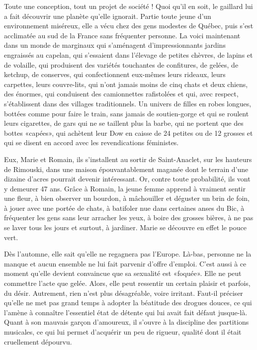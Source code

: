 Toute une conception, tout un projet de société ! Quoi qu’il en soit, le gaillard lui a fait découvrir une planète qu’elle ignorait. Partie toute jeune d’un environnement miséreux, elle a vécu chez des gens modestes de Québec, puis s’est acclimatée au sud de la France sans fréquenter personne. La voici maintenant dans un monde de marginaux qui s’aménagent d’impressionnants jardins engraissés au capelan, qui s’essaient dans l’élevage de petites chèvres, de lapins et de volaille, qui produisent des variétés touchantes de confitures, de gelées, de ketchup, de conserves, qui confectionnent eux-mêmes leurs rideaux, leurs carpettes, leurs couvre-lits, qui n’ont jamais moins de cinq chats et deux chiens, des énormes, qui conduisent des camionnettes rafistolées et qui, avec respect, s’établissent dans des villages traditionnels. Un univers de filles en robes longues, bottées comme pour faire le train, sans jamais de soutien-gorge et qui se roulent leurs cigarettes, de gars qui ne se taillent plus la barbe, qui ne portent que des bottes «capées», qui achètent leur Dow en caisse de 24 petites ou de 12 grosses et qui se disent en accord avec les revendications féministes.

Eux, Marie et Romain, ils s’installent au sortir de Saint-Anaclet, sur les hauteurs de Rimouski, dans une maison épouvantablement maganée dont le terrain d’une dizaine d’acres pourrait devenir intéressant. Or, contre toute probabilité, ils vont y demeurer 47 ans. Grâce à Romain, la jeune femme apprend à vraiment sentir une fleur, à bien observer un bourdon, à mâchouiller et déguster un brin de foin, à jouer avec une portée de chats, à batifoler nue dans certaines anses du Bic, à fréquenter les gens sans leur arracher les yeux, à boire des grosses bières, à ne pas se laver tous les jours et surtout, à jardiner. Marie se découvre en effet le pouce vert.

Dès l’automne, elle sait qu’elle ne regagnera pas l’Europe. Là-bas, personne ne la manque et aucun ensemble ne lui fait parvenir d’offre d’emploi. C’est aussi à ce moment qu’elle devient convaincue que sa sexualité est «foquée». Elle ne peut commettre l’acte que gelée. Alors, elle peut ressentir un certain plaisir et parfois, du désir. Autrement, rien n’est plus désagréable, voire irritant. Faut-il préciser qu’elle ne met pas grand temps à adopter la béatitude des drogues douces, ce qui l’amène à connaître l’essentiel état de détente qui lui avait fait défaut jusque-là. Quant à son mauvais garçon d’amoureux, il s’ouvre à la discipline des partitions musicales, ce qui lui permet d’acquérir un peu de rigueur, qualité dont il était cruellement dépourvu.

